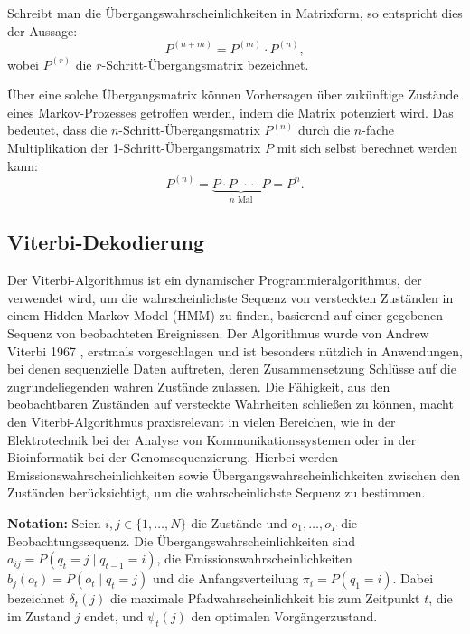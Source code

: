 Schreibt man die Übergangswahrscheinlichkeiten in Matrixform, so entspricht dies der Aussage:
\begin{equation}
P^{(n+m)} = P^{(m)} \cdot P^{(n)},
\end{equation}
wobei $P^{(r)}$ die $r$-Schritt-Übergangsmatrix bezeichnet.

Über eine solche Übergangsmatrix können Vorhersagen über zukünftige Zustände eines Markov-Prozesses getroffen werden, indem die Matrix potenziert wird.
Das bedeutet, dass die $n$-Schritt-Übergangsmatrix $P^{(n)}$ durch die $n$-fache Multiplikation der 1-Schritt-Übergangsmatrix $P$ mit sich selbst berechnet werden kann:
\begin{equation}
P^{(n)} = \underbrace{P \cdot P \cdot \cdots \cdot P}_{n \text{ Mal}} = P^n.
\end{equation} 


\subsection{Viterbi-Dekodierung}

Der Viterbi-Algorithmus ist ein dynamischer Programmieralgorithmus, der verwendet wird, um die wahrscheinlichste Sequenz von versteckten Zuständen in einem Hidden Markov Model (HMM) zu finden, basierend auf einer gegebenen Sequenz von beobachteten Ereignissen. Der Algorithmus wurde von Andrew Viterbi 1967 \citet{viterbierror},
erstmals vorgeschlagen und ist besonders nützlich in Anwendungen, bei denen sequenzielle Daten auftreten, deren Zusammensetzung Schlüsse auf die zugrundeliegenden wahren Zustände zulassen. Die Fähigkeit, aus den beobachtbaren Zuständen auf versteckte Wahrheiten schließen zu können, macht den Viterbi-Algorithmus praxisrelevant in vielen Bereichen, wie in der Elektrotechnik bei der Analyse von Kommunikationssystemen oder in der Bioinformatik bei der Genomsequenzierung.
Hierbei werden Emissionswahrscheinlichkeiten sowie Übergangswahrscheinlichkeiten zwischen den Zuständen berücksichtigt, um die wahrscheinlichste Sequenz zu bestimmen.

\medskip
\textbf{Notation:} 
Seien $i, j \in \{1, \ldots, N\}$ die Zustände und $o_1, \ldots, o_T$ die Beobachtungssequenz.
Die Übergangswahrscheinlichkeiten sind $a_{ij} = P(q_t = j \mid q_{t-1} = i)$, 
die Emissionswahrscheinlichkeiten $b_j(o_t) = P(o_t \mid q_t = j)$ und 
die Anfangsverteilung $\pi_i = P(q_1 = i)$.
Dabei bezeichnet $\delta_t(j)$ die maximale Pfadwahrscheinlichkeit bis zum Zeitpunkt $t$, die im Zustand $j$ endet, 
und $\psi_t(j)$ den optimalen Vorgängerzustand.

